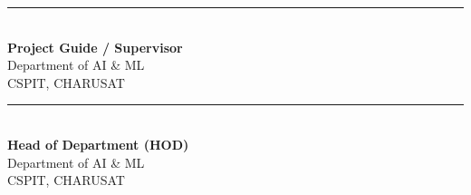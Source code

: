 \documentclass[11pt,a4paper]{article}
\begin{document}
\vspace{1.4cm}
\noindent
\begin{minipage}[t]{0.46\textwidth}
  \rule{\linewidth}{0.6pt}\\
  \textbf{Project Guide / Supervisor}\\
  Department of AI \& ML\\
  CSPIT, CHARUSAT
\end{minipage}
\hfill
\begin{minipage}[t]{0.46\textwidth}
  \rule{\linewidth}{0.6pt}\\
  \textbf{Head of Department (HOD)}\\
  Department of AI \& ML\\
  CSPIT, CHARUSAT
\end{minipage}

\clearpage
\end{document}
